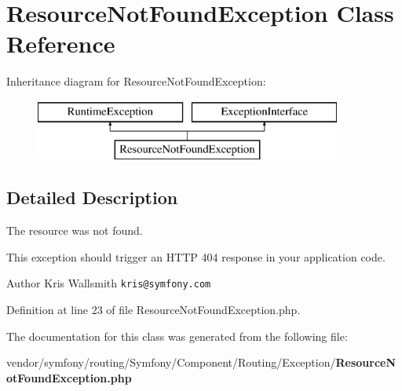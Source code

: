 \section{Resource\+Not\+Found\+Exception Class Reference}
\label{class_symfony_1_1_component_1_1_routing_1_1_exception_1_1_resource_not_found_exception}
Inheritance diagram for Resource\+Not\+Found\+Exception\+:\begin{figure}[H]
\begin{center}
\leavevmode
\includegraphics[height=2.000000cm]{class_symfony_1_1_component_1_1_routing_1_1_exception_1_1_resource_not_found_exception}
\end{center}
\end{figure}


\subsection{Detailed Description}
The resource was not found.

This exception should trigger an H\+T\+T\+P 404 response in your application code.

\begin{DoxyAuthor}{Author}
Kris Wallsmith {\tt kris@symfony.\+com}
\end{DoxyAuthor}


Definition at line 23 of file Resource\+Not\+Found\+Exception.\+php.



The documentation for this class was generated from the following file\+:\begin{DoxyCompactItemize}
\item 
vendor/symfony/routing/\+Symfony/\+Component/\+Routing/\+Exception/{\bf Resource\+Not\+Found\+Exception.\+php}\end{DoxyCompactItemize}
